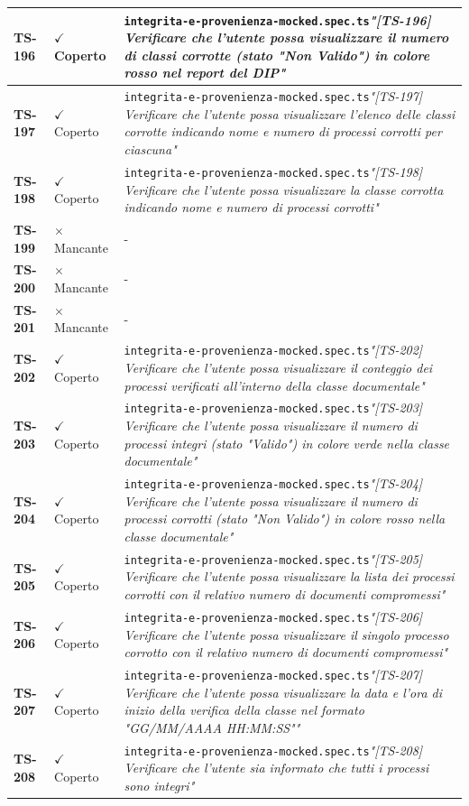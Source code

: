 \documentclass[a4paper,12pt]{article}
\newcommand{\ok}{\textcolor{green!60!black}{$\checkmark$ Coperto}}
\newcommand{\ko}{\textcolor{red!80!black}{$\times$ Mancante}}
\newcommand{\f}[1]{\nolinkurl{#1}\newline}
\newcommand{\q}[1]{\textit{#1}}
\begin{document}
\begin{longtable}{|p{1.5cm}|p{3.0cm}|p{10.5cm}|}
\textbf{TS-196} & \ok & \f{integrita-e-provenienza-mocked.spec.ts}\q{"[TS-196] Verificare che l'utente possa visualizzare il numero di classi corrotte (stato "Non Valido") in colore rosso nel report del DIP"} \\ \hline
\textbf{TS-197} & \ok & \f{integrita-e-provenienza-mocked.spec.ts}\q{"[TS-197] Verificare che l'utente possa visualizzare l'elenco delle classi corrotte indicando nome e numero di processi corrotti per ciascuna"} \\ \hline
\textbf{TS-198} & \ok & \f{integrita-e-provenienza-mocked.spec.ts}\q{"[TS-198] Verificare che l'utente possa visualizzare la classe corrotta indicando nome e numero di processi corrotti"} \\ \hline
\textbf{TS-199} & \ko & - \\ \hline
\textbf{TS-200} & \ko & - \\ \hline
\textbf{TS-201} & \ko & - \\ \hline
\textbf{TS-202} & \ok & \f{integrita-e-provenienza-mocked.spec.ts}\q{"[TS-202] Verificare che l'utente possa visualizzare il conteggio dei processi verificati all'interno della classe documentale"} \\ \hline
\textbf{TS-203} & \ok & \f{integrita-e-provenienza-mocked.spec.ts}\q{"[TS-203] Verificare che l'utente possa visualizzare il numero di processi integri (stato "Valido") in colore verde nella classe documentale"} \\ \hline
\textbf{TS-204} & \ok & \f{integrita-e-provenienza-mocked.spec.ts}\q{"[TS-204] Verificare che l'utente possa visualizzare il numero di processi corrotti (stato "Non Valido") in colore rosso nella classe documentale"} \\ \hline
\textbf{TS-205} & \ok & \f{integrita-e-provenienza-mocked.spec.ts}\q{"[TS-205] Verificare che l'utente possa visualizzare la lista dei processi corrotti con il relativo numero di documenti compromessi"} \\ \hline
\textbf{TS-206} & \ok & \f{integrita-e-provenienza-mocked.spec.ts}\q{"[TS-206] Verificare che l'utente possa visualizzare il singolo processo corrotto con il relativo numero di documenti compromessi"} \\ \hline
\textbf{TS-207} & \ok & \f{integrita-e-provenienza-mocked.spec.ts}\q{"[TS-207] Verificare che l'utente possa visualizzare la data e l'ora di inizio della verifica della classe nel formato "GG/MM/AAAA HH:MM:SS""} \\ \hline
\textbf{TS-208} & \ok & \f{integrita-e-provenienza-mocked.spec.ts}\q{"[TS-208] Verificare che l'utente sia informato che tutti i processi sono integri"} \\ \hline

\end{longtable}
\end{document}

